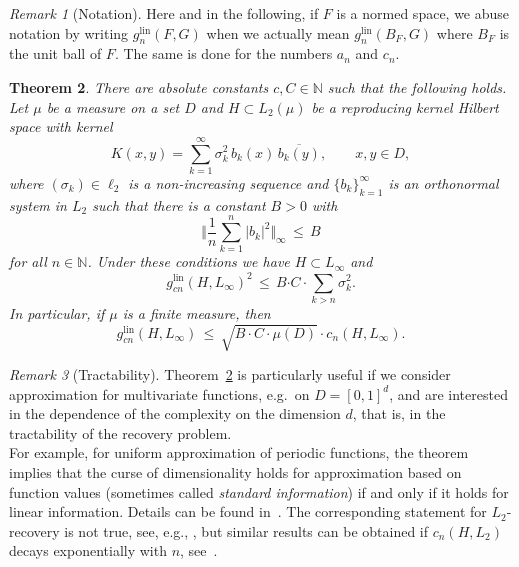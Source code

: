 \documentclass[a4paper,12pt]{amsart}
\newtheorem{theorem}{Theorem}
\theoremstyle{definition}
\theoremstyle{remark}
\newtheorem{remark}[theorem]{Remark}
\newcommand{\lin}{\ensuremath{\mathrm{lin}}}
\begin{document}
\begin{remark}[Notation] %
{Here and in the following,
if $F$ is a normed space,
we abuse notation
by writing $g_n^\lin(F,G)$ when we actually mean
$g_n^\lin(B_F,G)$ where $B_F$ is the unit ball of $F$. The same is done for the numbers $a_n$ and $c_n$.}
\end{remark}

\medskip

\begin{theorem}\label{thm:H}
There are
absolute constants 
{$c,C \in\mathbb{N}$}
such that the following holds.
Let $\mu$ be 
a measure
on a set $D$ 
and
$H\subset L_2(\mu)$ be a 
reproducing kernel Hilbert space 
with kernel
$$
K(x,y) = \sum_{k=1}^{\infty} \sigma_k^2\, b_k(x)\, \overline{b_k(y)}, 
\qquad x,y\in D, 
$$
where $(\sigma_k)\in \ell_2$ is a non-increasing sequence 
and $\{b_k\}_{k=1}^\infty$
is an orthonormal system in
$L_2$ 
such that there is a constant $B>0$ with
\begin{equation}\label{cond_boundedness}
    \Big\Vert \frac{1}{n}\sum_{k=1}^{n} \left| b_k \right|^2\Big\Vert_{\infty} 
\,\le\, B
\end{equation}
for all $n\in\mathbb{N}$. Under these conditions we have $H \subset L_\infty$ and 
\begin{equation}
\label{eq:Hilbert1}
g_{{cn}}^\lin( H , L_{\infty})^{2} \,\le\, 
 B {\cdot C \cdot}\sum\limits_{k > n}\sigma_k^2. 
\end{equation}
In particular, if $\mu$ is a finite measure, then
\begin{equation}
\label{eq:Hilbert2}
 g_{{cn}}^\lin( H , L_{\infty}) \,\le\, \sqrt{
  {B \cdot C} \cdot \mu(D)}\cdot c_n(H,L_\infty).
\end{equation}
\end{theorem}

\smallskip

\begin{remark}[Tractability]%
Theorem~\ref{thm:H} is particularly useful if we 
consider approximation for multivariate functions, 
e.g.~on $D=[0,1]^d$, and are interested 
in the dependence of the complexity on the dimension $d$,
that is, in the tractability of the recovery problem. \\
For example, for uniform approximation of periodic functions, 
the theorem implies that the curse of dimensionality holds for approximation 
based on function values (sometimes called \emph{standard information}) 
if and only if it holds for linear information. 
Details can be found in~\cite{GW23}.
The corresponding statement for $L_2$-recovery is not true, 
see, e.g., \cite{HKNV}, 
but similar results can be obtained if $c_n(H,L_2)$ decays exponentially 
with $n$, see~\cite{KSUW}.
\end{remark}
\end{document}
